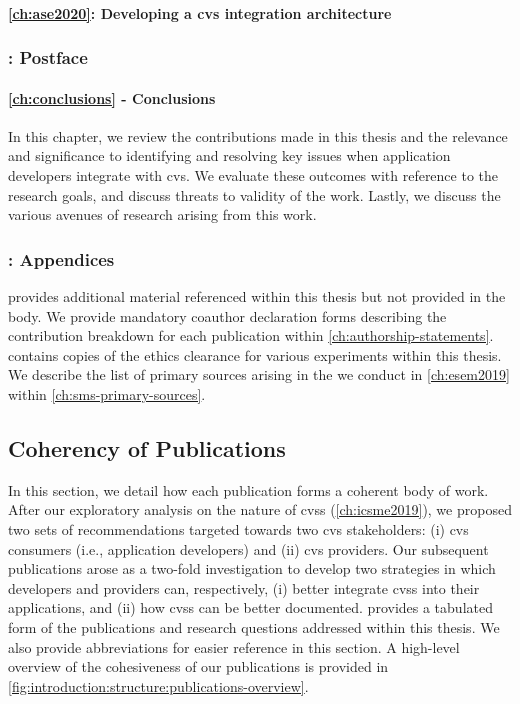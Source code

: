 \paragraph{\cref{ch:ase2020}: Developing a \gls{cvs} integration architecture} 

\subsubsection{: Postface}

\paragraph{\cref{ch:conclusions} - Conclusions} In this chapter, we review the contributions made in this thesis and the relevance and significance to identifying and resolving key issues when application developers integrate with \gls{cvs}. We evaluate these outcomes with reference to the research goals, and discuss threats to validity of the work. Lastly, we discuss the various avenues of research arising from this work.

\subsubsection{: Appendices}

 provides additional material referenced within this thesis but not provided in the body. We provide mandatory coauthor declaration forms describing the contribution breakdown for each publication within \cref{ch:authorship-statements}.  contains copies of the ethics clearance for various experiments within this thesis. We describe the list of primary sources arising in the  we conduct in \cref{ch:esem2019} within \cref{ch:sms-primary-sources}.


\subsection{Coherency of Publications}

In this section, we detail how each publication forms a coherent body of work. After our exploratory analysis on the nature of \glspl{cvs} (\cref{ch:icsme2019}), we proposed two sets of recommendations targeted towards two \gls{cvs} stakeholders: (i) \gls{cvs} consumers (i.e., application developers) and (ii) \gls{cvs} providers. Our subsequent publications arose as a two-fold investigation to develop two strategies in which developers and providers can, respectively, (i) better integrate \glspl{cvs} into their applications, and (ii) how \glspl{cvs} can be better documented.  provides a tabulated form of the publications and research questions addressed within this thesis. We also provide abbreviations for easier reference in this section. A high-level overview of the cohesiveness of our publications is provided in \cref{fig:introduction:structure:publications-overview}.


